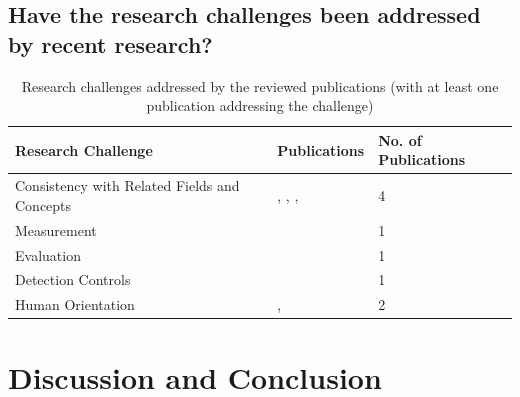 \documentclass[runningheads]{llncs}
\begin{document}
\subsection{Have the research challenges been addressed by recent research?}\label{Q2}
\begin{table}
    \centering
    \caption{Research challenges addressed by the reviewed publications (with at least one publication addressing the challenge)}
    \label{challenges_table}
    \begin{tabular}{ | l | l | l | }
        \hline
        \textbf{Research Challenge} & \textbf{Publications}                                                                                                                                                            & \textbf{No. of Publications} \\
        \hline
        \hline
        Consistency with Related Fields and Concepts & \cite{Zaman20192982}, \cite{Accorsi20131462}, \cite{Zahoransky2014360}, \cite{Dedousis202235} & 4                            \\
        \hline
        Measurement & \cite{Dedousis202235} & 1 \\
        \hline
        Evaluation & \cite{Zahoransky2014360} & 1 \\

        \hline
        Detection Controls & \cite{Mishra2018613} & 1 \\
        \hline
        Human Orientation & \cite{Mardani2013}, \cite{Zhu201783} & 2 \\
        \hline
    \end{tabular}
\end{table}

\section{Discussion and Conclusion}\label{Conclusion}

%
%
% 
% 
%

{}
\end{document}
